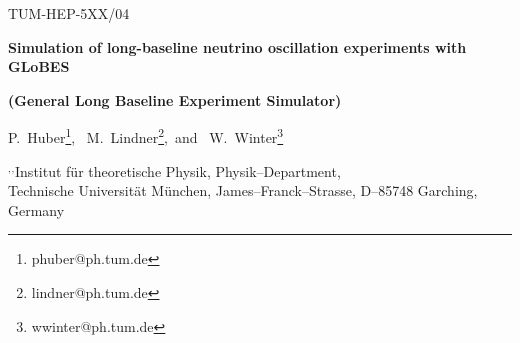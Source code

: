\documentclass[12pt,a4paper]{article}
\begin{document}

\begin{titlepage}

\renewcommand{\thefootnote}{\alph{footnote}}

\vspace*{-3.cm}
\begin{flushright}
TUM-HEP-5XX/04\\
\end{flushright}

\vspace*{0.5cm}

\renewcommand{\thefootnote}{\fnsymbol{footnote}}
\setcounter{footnote}{-1}

{\begin{center}
{\Large\bf Simulation of long-baseline neutrino oscillation
experiments with GLoBES}
\end{center}}
{\begin{center}
{\large\bf (General Long Baseline Experiment Simulator)}
\end{center}}
\renewcommand{\thefootnote}{\alph{footnote}}

\vspace*{.8cm}
{\begin{center} {\large{\sc
                P.~Huber\footnote[1]{
                phuber@ph.tum.de},~
                M.~Lindner\footnote[2]{
                lindner@ph.tum.de},~and~
                W.~Winter\footnote[5]{
                wwinter@ph.tum.de}
                }}
\end{center}}
\vspace*{0cm}
{\it
\begin{center}

\footnotemark[1]${}^,$\footnotemark[2]${}^,$\footnotemark[3]%
       Institut f\"ur theoretische Physik, Physik--Department,\\
       Technische Universit\"at M\"unchen,
       James--Franck--Strasse, D--85748 Garching, Germany


\end{center}}

\vspace*{1cm}



\end{titlepage}
\end{document}
